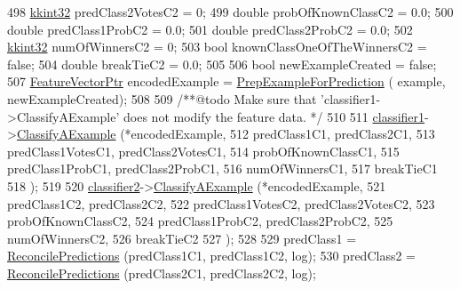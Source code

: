\begin{DoxyCode}
498   \hyperlink{namespace_k_k_b_a8fa4952cc84fda1de4bec1fbdd8d5b1b}{kkint32}          predClass2VotesC2  = 0;
499   \textcolor{keywordtype}{double}           probOfKnownClassC2 = 0.0;
500   \textcolor{keywordtype}{double}           predClass1ProbC2   = 0.0;
501   \textcolor{keywordtype}{double}           predClass2ProbC2   = 0.0;
502   \hyperlink{namespace_k_k_b_a8fa4952cc84fda1de4bec1fbdd8d5b1b}{kkint32}          numOfWinnersC2     = 0;
503   \textcolor{keywordtype}{bool}             knownClassOneOfTheWinnersC2 = \textcolor{keyword}{false};
504   \textcolor{keywordtype}{double}           breakTieC2         = 0.0;
505 
506   \textcolor{keywordtype}{bool}  newExampleCreated = \textcolor{keyword}{false};
507   \hyperlink{class_k_k_m_l_l_1_1_feature_vector}{FeatureVectorPtr}  encodedExample = \hyperlink{class_k_k_m_l_l_1_1_model_a31b972adfb64769b3ae966debec824fd}{PrepExampleForPrediction} (
      example, newExampleCreated);
508 \textcolor{comment}{}
509 \textcolor{comment}{  /**@todo   Make sure that 'classifier1->ClassifyAExample' does not modify the feature data. */}
510 
511   \hyperlink{class_k_k_m_l_l_1_1_model_dual_a702b5e302cc05ab6cdc3ee4ae8115622}{classifier1}->\hyperlink{class_k_k_m_l_l_1_1_classifier2_a071ddf2533fbd732558aa8bcfd9f1878}{ClassifyAExample} (*encodedExample, 
512                                predClass1C1,       predClass2C1, 
513                                predClass1VotesC1,  predClass2VotesC1,
514                                probOfKnownClassC1,
515                                predClass1ProbC1,   predClass2ProbC1,
516                                numOfWinnersC1,
517                                breakTieC1
518                               );
519 
520   \hyperlink{class_k_k_m_l_l_1_1_model_dual_a18ed538fadc0cb3eebdb9175ccce22e2}{classifier2}->\hyperlink{class_k_k_m_l_l_1_1_classifier2_a071ddf2533fbd732558aa8bcfd9f1878}{ClassifyAExample} (*encodedExample, 
521                                predClass1C2,       predClass2C2, 
522                                predClass1VotesC2,  predClass2VotesC2,
523                                probOfKnownClassC2,
524                                predClass1ProbC2,   predClass2ProbC2,
525                                numOfWinnersC2,
526                                breakTieC2
527                               );
528 
529   predClass1 = \hyperlink{class_k_k_m_l_l_1_1_model_dual_a3c48848a74244130f9757e0e411d5f4b}{ReconcilePredictions} (predClass1C1, predClass1C2, log);
530   predClass2 = \hyperlink{class_k_k_m_l_l_1_1_model_dual_a3c48848a74244130f9757e0e411d5f4b}{ReconcilePredictions} (predClass2C1, predClass2C2, log);

\end{DoxyCode}
